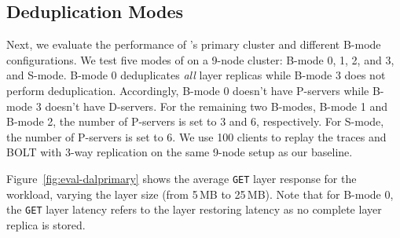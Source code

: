 


\subsection{Deduplication Modes}
\label{sec:eval-primary}
Next, we evaluate the performance of \sysname's primary cluster
and different B-mode configurations.
%
We test five modes of \sysname on a 9-node cluster: B-mode 0, 1, 2, and 3,
and S-mode.
%
B-mode 0 deduplicates \emph{all} layer replicas while B-mode 3 does not perform deduplication.
%
Accordingly, B-mode 0 doesn't have P-servers while B-mode 3 doesn't have D-servers.
%
For the remaining two B-modes, B-mode 1 and B-mode 2, the number of P-servers
is set to 3 and 6, respectively. For S-mode, the number of P-servers is set to 6.
%
We use 100 clients to replay the traces and BOLT with 3-way replication on the same 9-node setup as our baseline. 

%
Figure~\ref{fig:eval-dalprimary} shows the average \texttt{GET} layer response
for the \dal workload, varying the layer size (from 5\,MB to 25\,MB).
%
Note that for B-mode 0, the \texttt{GET} layer latency refers to the
layer restoring latency as no complete layer replica is stored.



